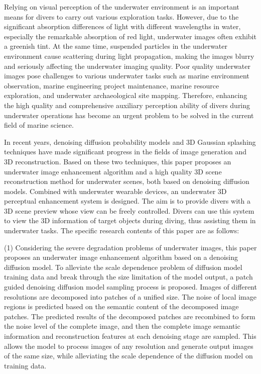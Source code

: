 \begin{abstract*}
Relying on visual perception of the underwater environment is an important means for divers to carry out various exploration tasks.
However, due to the significant absorption differences of light with different wavelengths in water, especially the remarkable absorption of red light, underwater images often exhibit a greenish tint. 
At the same time, suspended particles in the underwater environment cause scattering during light propagation, making the images blurry and seriously affecting the underwater imaging quality. 
Poor quality underwater images pose challenges to various underwater tasks such as marine environment observation, marine engineering project maintenance, marine resource exploration, and underwater archaeological site mapping. 
Therefore, enhancing the high quality and comprehensive auxiliary perception ability of divers during underwater operations has become an urgent problem to be solved in the current field of marine science.

In recent years, denoising diffusion probability models and 3D Gaussian splashing techniques have made significant progress in the fields of image generation and 3D reconstruction. 
Based on these two techniques, this paper proposes an underwater image enhancement algorithm and a high quality 3D scene reconstruction method for underwater scenes, both based on denoising diffusion models. 
Combined with underwater wearable devices, an underwater 3D perceptual enhancement system is designed. 
The aim is to provide divers with a 3D scene preview whose view can be freely controlled. Divers can use this system to view the 3D information of target objects during diving, thus assisting them in underwater tasks. 
The specific research contents of this paper are as follows:

(1) Considering the severe degradation problems of underwater images, this paper proposes an underwater image enhancement algorithm based on a denoising diffusion model. 
To alleviate the scale dependence problem of diffusion model training data and break through the size limitation of the model output, a patch guided denoising diffusion model sampling process is proposed. 
Images of different resolutions are decomposed into patches of a unified size. The noise of local image regions is predicted based on the semantic content of the decomposed image patches. 
The predicted results of the decomposed patches are recombined to form the noise level of the complete image, and then the complete image semantic information and reconstruction features at each denoising stage are sampled. 
This allows the model to process images of any resolution and generate output images of the same size, while alleviating the scale dependence of the diffusion model on training data.


\end{abstract*}
